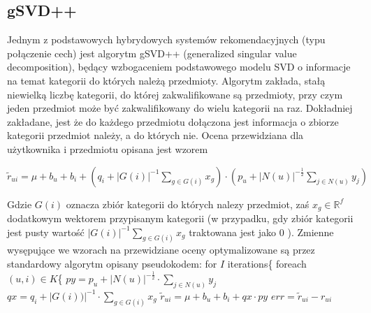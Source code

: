 \documentclass{pracamgr}
\begin{document}
   \subsection{gSVD++}
    Jednym z podstawowych hybrydowych systemów rekomendacyjnych (typu połączenie cech) jest algorytm gSVD++ (generalized singular value decomposition),
    będący wzbogaceniem podstawowego modelu SVD o informacje na temat kategorii do których należą przedmioty.
    Algorytm zakłada, stałą niewielką liczbę kategorii, do której zakwalifikowane są przedmioty, przy czym jeden przedmiot może być zakwalifikowany do wielu
    kategorii na raz.
    Dokładniej zakładane, jest że do każdego przedmiotu dołączona jest informacja o zbiorze kategorii przedmiot należy, a do których nie.\newline
    Ocena przewidziana dla użytkownika i przedmiotu opisana jest wzorem
    \begin{center}
     $\tilde{r}_{ui}=\mu+b_u+b_i+\left(q_i+|G(i)|^{-1}\sum\limits_{g\in G(i)}x_{g}\right)\cdot\left(p_u +|N(u)|^{-\frac{1}{2}}\sum\limits_{j\in N(u)}y_j\right)$
    \end{center}
    Gdzie $G(i)$ oznacza zbiór kategorii do których nalezy przedmiot, zaś $x_{g}\in\mathbb{R}^f$ dodatkowym wektorem przypisanym kategorii
    (w przypadku, gdy zbiór kategorii jest pusty wartość $|G(i)|^{-1}\sum\limits_{g\in G(i)}x_{g}$ traktowana jest jako $0$ ).
    Zmienne wysępujące we wzorach na przewidziane oceny optymalizowane są przez standardowy algorytm opisany pseudokodem:\newline
    \hspace*{16pt}	for $I$ iterations\{\newline
    \hspace*{32pt}		foreach $(u,i)\in K$\{\newline
    \hspace*{48pt}			$py=p_u +|N(u)|^{-\frac{1}{2}}\cdot\sum\limits_{j\in N(u)}y_j$\newline
    \hspace*{48pt}			$qx=q_i +|G(i))|^{-1}\cdot\sum\limits_{g\in G(i)}x_g$\newline
    \hspace*{48pt}			$\tilde{r}_{ui}=\mu+b_u+b_i+qx\cdot py$\newline
    \hspace*{48pt}			$err=\tilde{r}_{ui}-r_{ui}$\newline
\end{document}
